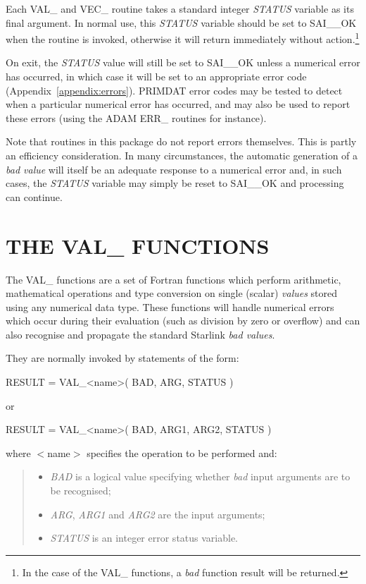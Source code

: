 \documentclass[11pt,nolof]{starlink}
\providecommand{\name}[1]{#1}
\providecommand{\fortvar}[1]{\emph{#1}}
\begin{document}
Each \name{VAL\_} and \name{VEC\_} routine takes a standard
integer \fortvar{STATUS} variable as its final argument.
In normal use, this \fortvar{STATUS} variable should be set to
\name{SAI\_\_OK} when the routine is invoked, otherwise it will return
immediately without action.\footnote{
In the case of the \name{VAL\_} functions, a \emph{bad} function result will
be returned.}

On exit, the \fortvar{STATUS} value will still be set to \name{SAI\_\_OK}
unless a numerical error has occurred, in which case it will be set to an
appropriate error code (Appendix~\ref{appendix:errors}).
\name{PRIMDAT} error codes may be tested to detect when a particular
numerical error has occurred, and may also be used to report these errors
(using the \name{ADAM} \name{ERR\_} routines for instance).

Note that routines in this package do not report errors themselves.
This is partly an efficiency consideration.
In many circumstances, the automatic generation of a \emph{bad value} will
itself be an adequate response to a numerical error and, in such cases, the
\fortvar{STATUS} variable may simply be reset to \name{SAI\_\_OK} and
processing can continue.

\section{THE \name{VAL\_} FUNCTIONS}

\label{section:val}

The \name{VAL\_} functions are a set of Fortran functions which perform
arithmetic, mathematical operations and type conversion on single (scalar)
\emph{values} stored using any numerical data type.
These functions will handle numerical errors which occur during their
evaluation (such as division by zero or overflow) and can also recognise and
propagate the standard Starlink \emph{bad values}.

They are normally invoked by statements of the form:

\begin{terminalv}
RESULT = VAL_<name>( BAD, ARG, STATUS )
\end{terminalv}
or
\begin{terminalv}
RESULT = VAL_<name>( BAD, ARG1, ARG2, STATUS )
\end{terminalv}

where \name{$<$name$>$} specifies the operation to be performed and:

\begin{quote}
\begin{itemize}

\item \fortvar{BAD} is a logical value specifying whether \emph{bad}
input arguments are to be recognised;

\item \fortvar{ARG}, \fortvar{ARG1} and \fortvar{ARG2} are the input
arguments;

\item \fortvar{STATUS} is an integer error status variable.

\end{itemize}
\end{quote}
\end{document}
